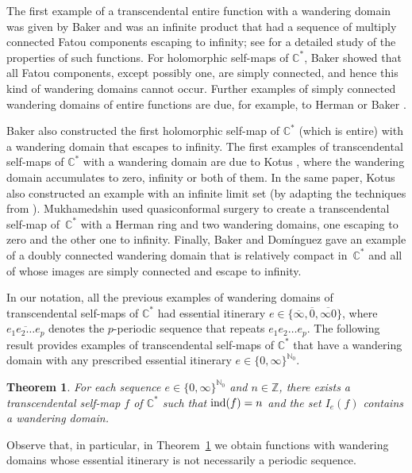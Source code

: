\documentclass[a4paper, 12pt, reqno]{amsart}
\numberwithin{equation}{section}
\theoremstyle{plain}
\newtheorem{thm}{Theorem}[section]
\theoremstyle{definition}
\theoremstyle{remark}
\newcommand{\C}{{\mathbb{C}}}
\newcommand{\Z}{{\mathbb{Z}}}
\newcommand{\N}{{\mathbb{N}}}
\begin{document}
The first example of a transcendental entire function with a wandering domain was given by Baker \cite{baker63, baker76} and was an infinite product that had a sequence of multiply connected Fatou components escaping to infinity; see \cite{bergweiler-rippon-stallard13} for a detailed study of the properties of such functions. For holomorphic self-maps of $\C^*$, Baker \cite{baker87} showed that all Fatou components, except possibly one, are simply connected, and hence this kind of wandering domains cannot occur. Further examples of simply connected wandering domains of entire functions are due, for example, to Herman \cite[Example~2]{baker84} or Baker \cite[Example~5.3]{baker84}.  

Baker \cite{baker87} also constructed the first holomorphic self-map of $\C^*$ (which is entire) with a wandering domain that escapes to infinity. The first examples of trans\-cendental self-maps of $\C^*$ with a wandering domain are due to Kotus \cite{kotus90}, where the wandering domain accumulates to zero, infinity or both of them. In the same paper, Kotus also constructed an example with an infinite limit set (by adapting the techniques from \cite{eremenko-lyubich92}). Mukhamedshin \cite{mukhamedshin91} used quasiconformal surgery to create a trans\-cendental self-map of~$\C^*$ with a Herman ring and two wandering domains, one escaping to zero and the other one to infinity. Finally, Baker and Dom\'inguez \cite[Theorem~6]{baker-dominguez98} gave an example of a doubly connected wandering domain that is relatively compact in~$\C^*$ and all of whose images are simply connected and escape to infinity. 

In our notation, all the previous examples of wandering domains of transcendental self-maps of $\C^*$ had essential itinerary $e\in\{\overline{\infty},\overline{0}, \overline{\infty 0}\}$, where $\overline{e_1e_2\hdots e_p}$ denotes the $p$-periodic sequence that repeats $e_1e_2\hdots e_p$. The following result provides examples of transcendental self-maps of $\C^*$ that have a wandering domain with any prescribed essential itinerary $e\in\{0,\infty\}^{\N_0}$. 

\begin{thm}
\label{thm:wandering-domains}
For each sequence $e\in\{0,\infty\}^{\N_0}$ and $n\in\Z$, there exists a trans\-cendental self-map $f$ of $\C^*$ such that $\textup{ind}(f)=n$ and the set $I_e(f)$ contains a wandering domain.
\end{thm}

Observe that, in particular, in Theorem~\ref{thm:wandering-domains} we obtain functions with wandering domains whose essential itinerary is not necessarily a periodic sequence. %
\end{document}
